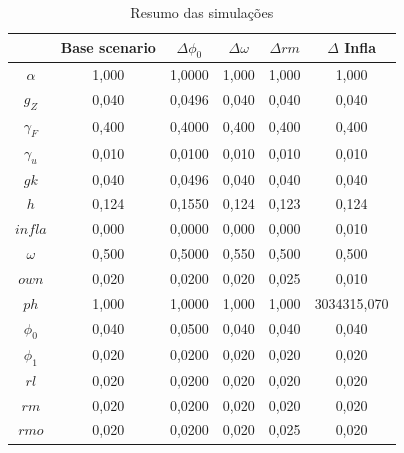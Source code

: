 \begin{table}[htb]
    \centering
    \caption{Resumo das simulações}
    \label{Resumo_Simulacao}
         \begin{tabular}{cccccc}
	\toprule
{} &  Base scenario &  $\Delta \phi_0$ &  $\Delta \omega$ &  $\Delta rm$ &  $\Delta $ Infla \\
\midrule
\textbf{$\alpha$} &          1,000 &        1,0000 &            1,000 &        1,000 &            1,000 \\
\textbf{$g_Z$} &          0,040 &        0,0496 &            0,040 &        0,040 &            0,040 \\
\textbf{$\gamma_F$} &          0,400 &        0,4000 &            0,400 &        0,400 &            0,400 \\
\textbf{$\gamma_u$} &          0,010 &        0,0100 &            0,010 &        0,010 &            0,010 \\
\textbf{$gk$       } &          0,040 &        0,0496 &            0,040 &        0,040 &            0,040 \\
\textbf{$h$        } &          0,124 &        0,1550 &            0,124 &        0,123 &            0,124 \\
\textbf{$infla$    } &          0,000 &        0,0000 &            0,000 &        0,000 &            0,010 \\
\textbf{$\omega$    } &          0,500 &        0,5000 &            0,550 &        0,500 &            0,500 \\
\textbf{$own$      } &          0,020 &        0,0200 &            0,020 &        0,025 &            0,010 \\
\textbf{$ph$       } &          1,000 &        1,0000 &            1,000 &        1,000 &      3034315,070 \\
\textbf{$\phi_0$    } &          0,040 &        0,0500 &            0,040 &        0,040 &            0,040 \\
\textbf{$\phi_1$    } &          0,020 &        0,0200 &            0,020 &        0,020 &            0,020 \\
\textbf{$rl$       } &          0,020 &        0,0200 &            0,020 &        0,020 &            0,020 \\
\textbf{$rm$       } &          0,020 &        0,0200 &            0,020 &        0,020 &            0,020 \\
\textbf{$rmo$      } &          0,020 &        0,0200 &            0,020 &        0,025 &            0,020 \\

\end{tabular}
\end{table}

